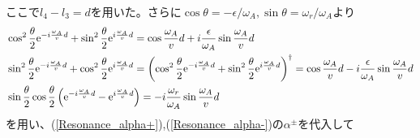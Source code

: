 ここで$l_4-l_3=d$を用いた。さらに$\cos\theta=-\epsilon/\omega_A,\sin\theta=\omega_r/\omega_A$より
\begin{align}
&\cos^2 \frac{\theta}{2} \mathrm{e}^{-i\frac{\omega_A}{v}d} +\sin^2 \frac{\theta}{2} \mathrm{e}^{i\frac{\omega_A}{v}d} =\cos \frac{\omega_A}{v}d +i\frac{\epsilon}{\omega_A} \sin \frac{\omega_A}{v}d \\
&\sin^2 \frac{\theta}{2} \mathrm{e}^{-i\frac{\omega_A}{v}d} +\cos^2 \frac{\theta}{2} \mathrm{e}^{i\frac{\omega_A}{v}d} =\left(\cos^2 \frac{\theta}{2} \mathrm{e}^{-i\frac{\omega_A}{v}d} +\sin^2 \frac{\theta}{2} \mathrm{e}^{i\frac{\omega_A}{v}d}\right)^\dagger=\cos \frac{\omega_A}{v}d -i\frac{\epsilon}{\omega_A} \sin \frac{\omega_A}{v}d \\
&\sin\frac{\theta}{2}\cos\frac{\theta}{2} \left(\mathrm{e}^{-i\frac{\omega_A}{v}d}-\mathrm{e}^{i\frac{\omega_A}{v}d}\right) = -i \frac{\omega_r}{\omega_A} \sin \frac{\omega_A}{v}d
\end{align}
を用い、(\ref{Resonance_alpha+}),(\ref{Resonance_alpha-})の$\alpha^\pm$を代入して
